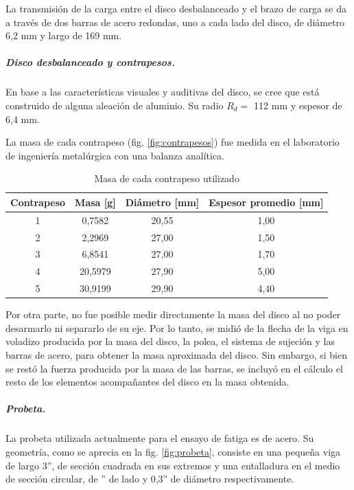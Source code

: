La transmisión de la carga entre el disco desbalanceado y el brazo de carga se da a través de dos barras de acero redondas, uno a cada lado del disco, de diámetro 6,2 mm y largo de 169 mm.

\subparagraph{Disco desbalanceado y contrapesos.}
En base a las características visuales y auditivas del disco, se cree que está construido de alguna aleación de aluminio. Su radio $R_d =$ 112 mm y espesor de 6,4 mm. 

La masa de cada contrapeso (fig. \ref{fig:contrapesos}) fue medida en el laboratorio de ingeniería metalúrgica con una balanza analítica.
\begin{table}[H]
\centering
\begin{tabular}{@{}cccc@{}}
\toprule
Contrapeso & Masa {[}g{]}	& Diámetro {[}mm{]}	&	Espesor promedio {[}mm{]} \\ \midrule
1          & 0,7582			& 20,55				&	1,00	         		  \\
2          & 2,2969       	& 27,00				&	1,50					  \\
3          & 6,8541       	& 27,00				& 	1,70	 		   		  \\
4          & 20,5979      	& 27,90				& 	5,00			 		  \\
5          & 30,9199      	& 29,90				&	4,40			 		  \\ \bottomrule
\end{tabular}
\caption{Masa de cada contrapeso utilizado}
\label{tab:masa_contrapesos}
\end{table}

Por otra parte, no fue posible medir directamente la masa del disco al no poder desarmarlo ni separarlo de su eje. Por lo tanto, se midió de la flecha de la viga en voladizo producida por la masa del disco, la polea, el sistema de sujeción y las barras de acero, para obtener la masa aproximada del disco. Sin embargo, si bien se restó la fuerza producida por la masa de las barras, se incluyó en el cálculo el resto de los elementos acompañantes del disco en la masa obtenida.

\subparagraph{Probeta.} La probeta utilizada actualmente para el ensayo de fatiga es de acero. Su geometría, como se aprecia en la fig. \ref{fig:probeta}, consiste en una pequeña viga de largo 3'', de sección cuadrada en sus extremos y una entalladura en el medio de sección circular, de '' de lado y 0,3'' de diámetro respectivamente.
 
